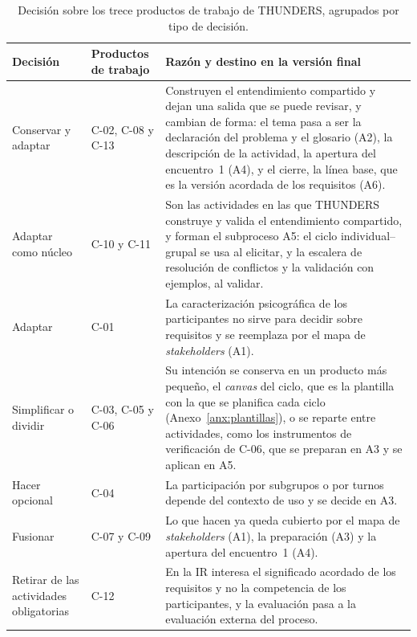 \documentclass[12pt,letterpaper,oneside]{report}
\begin{document}
\begin{table}[H]
\caption{Decisión sobre los trece productos de trabajo de THUNDERS, agrupados por tipo
de decisión.}
\label{tab:decisiones}
\centering
\footnotesize
\renewcommand{\arraystretch}{1.15}
\begin{tabularx}{\textwidth}{@{}L{2.9cm}L{2.4cm}Y@{}}
\toprule
\textbf{Decisión} & \textbf{Productos de trabajo} & \textbf{Razón y destino en la
versión final} \\
\midrule
Conservar y adaptar & C-02, C-08 y C-13 & Construyen el entendimiento compartido y dejan
una salida que se puede revisar, y cambian de forma: el tema pasa a ser la
declaración del problema y el glosario (A2), la descripción de la actividad, la
apertura del encuentro~1 (A4), y el cierre, la línea base, que es la versión
acordada de los requisitos (A6). \\
\addlinespace
Adaptar como núcleo & C-10 y C-11 & Son las actividades en las que THUNDERS
construye y valida el entendimiento compartido, y forman el subproceso A5: el ciclo
individual--grupal se usa al elicitar, y la escalera de resolución de
conflictos y la validación con ejemplos, al validar. \\
\addlinespace
Adaptar & C-01 & La caracterización psicográfica de los participantes no
sirve para decidir sobre requisitos y se reemplaza por el mapa de
\textit{stakeholders} (A1). \\
\addlinespace
Simplificar o dividir & C-03, C-05 y C-06 & Su intención se conserva en un
producto más pequeño, el \textit{canvas} del ciclo, que es la plantilla con la
que se planifica cada ciclo (Anexo~\ref{anx:plantillas}), o se reparte entre
actividades, como los instrumentos de verificación de C-06, que se preparan en
A3 y se aplican en A5. \\
\addlinespace
Hacer opcional & C-04 & La participación por subgrupos o por turnos depende
del contexto de uso y se decide en A3. \\
\addlinespace
Fusionar & C-07 y C-09 & Lo que hacen ya queda cubierto por el mapa de
\textit{stakeholders} (A1), la preparación (A3) y la apertura del
encuentro~1 (A4). \\
\addlinespace
Retirar de las actividades obligatorias & C-12 & En la IR interesa el
significado acordado de los requisitos y no la competencia de los participantes, y la evaluación
pasa a la evaluación externa del proceso. \\
\bottomrule
\end{tabularx}
\end{table}
\end{document}
